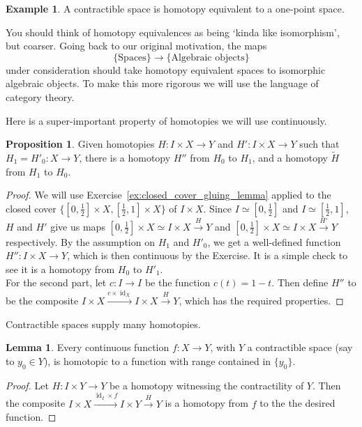 \documentclass{tufte-handout}
\DeclareMathOperator{\id}{id}
\theoremstyle{definition}
\newtheorem{prop}{Proposition}
\newtheorem{lemma}{Lemma}
\newtheorem{example}{Example}
\begin{document}
\begin{example}
A contractible space is homotopy equivalent to a one-point space.
\end{example}

You should think of homotopy equivalences as being `kinda like isomorphism', but coarser.
Going back to our original motivation, the maps
\[
	\{\text{Spaces}\} \longrightarrow \{\text{Algebraic objects}\}
\]
under consideration should take homotopy equivalent spaces to isomorphic algebraic objects. 
To make this more rigorous we will use the language of category theory.


%
Here is a super-important property of homotopies we will use continuously.

\begin{prop}
Given homotopies $H\colon I \times X \to Y$ and $H'\colon I \times X \to Y$ such that $H_1 = H'_0\colon X\to Y$, there is a homotopy $H''$ from $H_0$ to $H_1$, and a homotopy $\widetilde{H}$ from $H_1$ to $H_0$.
\end{prop}

\begin{proof}
We will use Exercise~\ref{ex:closed_cover_gluing_lemma} applied to the closed cover $\{[0,\frac12]\times X, [\frac12,1]\times X\}$ of $I\times X$. 
Since $I \simeq [0,\frac12]$ and $I\simeq [\frac12,1]$, $H$ and $H'$ give us maps $[0,\frac12]\times X \simeq I\times X\xrightarrow{H} Y$ and $[0,\frac12]\times X \simeq I\times X\xrightarrow{H'} Y$ respectively. By the assumption on $H_1$ and $H'_0$, we get a well-defined function $H''\colon I\times X\to Y$, which is then continuous by the Exercise. It is a simple check to see it is a homotopy from $H_0$ to $H'_1$. \\
For the second part, let $c\colon I\to I$ be the function $c(t) = 1-t$. Then define $H''$ to be the composite $I\times X \xrightarrow{c\times \id_X} I \times X \xrightarrow{H}Y$, which has the required properties.
\end{proof}

Contractible spaces supply many homotopies.

\begin{lemma}
Every continuous function $f\colon X\to Y$, with $Y$ a contractible space (say to $y_0\in Y$), is homotopic to a function with range contained in $\{y_0\}$.
\end{lemma}

\begin{proof}
Let $H\colon I\times Y \to Y$ be a homotopy witnessing the contractility of $Y$. Then the composite $I\times X \xrightarrow{\id_I \times f} I\times Y \xrightarrow{H} Y$ is a homotopy from $f$ to the the desired function.
\end{proof}
\end{document}
